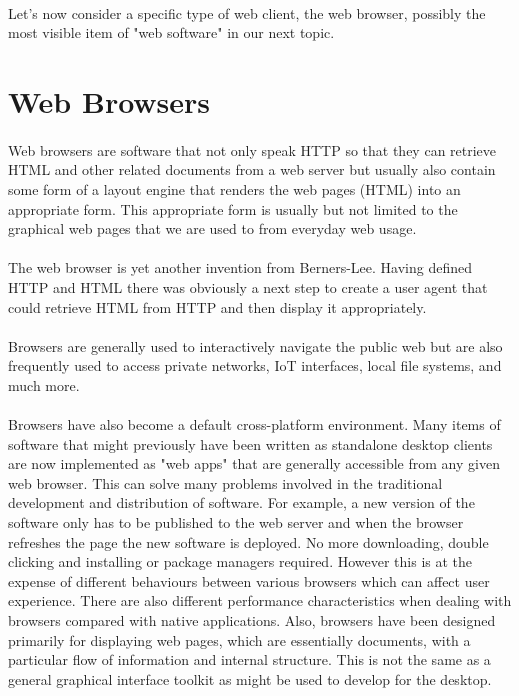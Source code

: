\documentclass[12pt, a4paper, oneside]{book}
\begin{document}
\paragraph{} Let's now consider a specific type of web client, the web browser, possibly the most visible item of "web software" in our next topic.


\section{Web Browsers}
\paragraph{} Web browsers are software that not only speak HTTP so that they can retrieve HTML and other related documents from a web server but usually also contain some form of a layout engine that renders the web pages (HTML) into an appropriate form. This appropriate form is usually but not limited to the graphical web pages that we are used to from everyday web usage.
\paragraph{} The web browser is yet another invention from Berners-Lee. Having defined HTTP and HTML there was obviously a next step to create a user agent that could retrieve HTML from HTTP and then display it appropriately.
\paragraph{} Browsers are generally used to interactively navigate the public web but are also frequently used to access private networks, IoT interfaces, local file systems, and much more. 
\paragraph{} Browsers have also become a default cross-platform environment. Many items of software that might previously have been written as standalone desktop clients are now implemented as "web apps" that are generally accessible from any given web browser. This can solve many problems involved in the traditional development and distribution of software. For example, a new version of the software only has to be published to the web server and when the browser refreshes the page the new software is deployed. No more downloading, double clicking and installing or package managers required. However this is at the expense of different behaviours between various browsers which can affect user experience. There are also different performance characteristics when dealing with browsers compared with native applications. Also, browsers have been designed primarily for displaying web pages, which are essentially documents, with a particular flow of information and internal structure. This is not the same as a general graphical interface toolkit as might be used to develop for the desktop.
\end{document}
